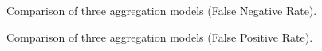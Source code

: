 \documentclass[conference]{IEEEtran}
\begin{document}
\begin{figure}[htbp]

\centering
{}
\caption{Comparison of three aggregation models (False Negative Rate).}
\label{fig2}
\end{figure}

\begin{figure}[htbp]

\centering
{}
\caption{Comparison of three aggregation models (False Positive Rate).}
\label{fig3}
\end{figure}
\end{document}
